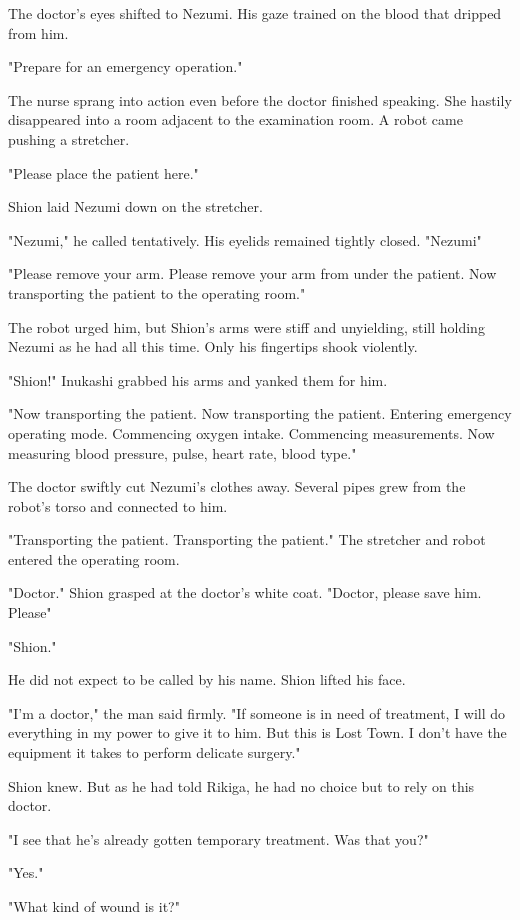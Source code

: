 The doctor's eyes shifted to Nezumi. His gaze trained on the blood that
dripped from him.

"Prepare for an emergency operation."

The nurse sprang into action even before the doctor finished speaking.
She hastily disappeared into a room adjacent to the examination room. A
robot came pushing a stretcher.

{\sffamily "Please place the patient here."}

Shion laid Nezumi down on the stretcher.

"Nezumi," he called tentatively. His eyelids remained tightly closed.
"Nezumi\el "

{\sffamily "Please remove your arm. Please remove your arm from under the patient.
Now transporting the patient to the operating room."}

The robot urged him, but Shion's arms were stiff and unyielding, still
holding Nezumi as he had all this time. Only his fingertips shook
violently.

"Shion!" Inukashi grabbed his arms and yanked them for him.

{\sffamily "Now transporting the patient. Now transporting the patient. Entering
	emergency operating mode. Commencing oxygen intake. Commencing
	measurements. Now measuring blood pressure, pulse, heart rate, blood
	type."}

The doctor swiftly cut Nezumi's clothes away. Several pipes grew from
the robot's torso and connected to him.

{\sffamily "Transporting the patient. Transporting the patient."} The stretcher and
robot entered the operating room.

"Doctor." Shion grasped at the doctor's white coat. "Doctor, please\el 
save him. Please\el "

"Shion."

He did not expect to be called by his name. Shion lifted his face.

"I'm a doctor," the man said firmly. "If someone is in need of
treatment, I will do everything in my power to give it to him. But this
is Lost Town. I don't have the equipment it takes to perform delicate
surgery."

Shion knew. But as he had told Rikiga, he had no choice but to rely on
this doctor.

"I see that he's already gotten temporary treatment. Was that you?"

"Yes."

"What kind of wound is it?"

